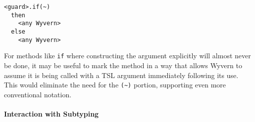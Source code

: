 \begin{lstlisting}
<guard>.if(~)
  then
    <any Wyvern>
  else
    <any Wyvern>
\end{lstlisting}

For methods like \verb|if| where constructing the argument explicitly will almost never be done, it may be useful to mark the method in a way that allows Wyvern to assume it is being called with a TSL argument immediately following its use. This would eliminate the need for the \verb|(~)| portion, supporting even more conventional notation.

%
%

\paragraph{Interaction with Subtyping}

